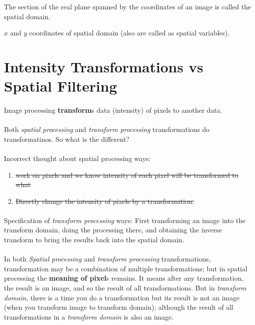 \begin{definition}  \hfill
    The section of the real plane spanned by the coordinates of an image is
    called the spatial domain.
\end{definition}

\begin{definition}  \hfill
    $x$ and $y$ coordinates of spatial domain (also are called as spatial
    variables).
\end{definition}

\section{Intensity Transformations vs Spatial Filtering}

\paragraph*{} Image processing \textbf{transform}s data (intensity) of pixels to
another data.

\paragraph*{}Both \emph{spatial processing} and \emph{transform processing}
transformations do transformatinos. So what is the different? 

\paragraph*{} Incorrect thought about spatial processing ways:
\begin{enumerate}
    \item \st{work on pixels and we know intensity of each pixel will be
    transformed to what}
    \item \st{Directly change the intensity of pixels by a transformation.}
\end{enumerate}

\paragraph*{}{Specification of \emph{transform processing} ways: \newline
First transforming an image into the transform domain, doing the processing
there, and obtaining the inverse transform to bring the results back into the
spatial domain.}

\paragraph*{} In both \emph{Spatial processing} and \emph{transform processing}
transformations, transformation may be a combination of multiple
transformations; but in spatial processing the \textbf{meaning of pixel}s
remains. It means after any transformation, the result is an image, and so the
result of all transformations. But in \emph{transform domain}, there is a time
you do a transformation but its result is not an image (when you transform
image to transform domain); although the result of all transformations
in a \emph{transform domain} is also an image.

